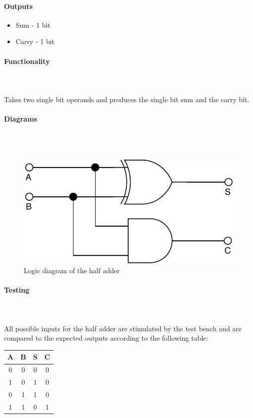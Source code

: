 \documentclass{article}
\begin{document}
    \paragraph{Outputs}
    \begin{itemize}
        \item Sum - 1 bit
        \item Carry - 1 bit
    \end{itemize}

    \paragraph{Functionality}
    \hfill\\\\
    Takes two single bit operands and produces the single bit sum and the
    carry bit.

    \paragraph{Diagrams}
    \hfill\\\\
    \begin{figure}[H]
        \centering
        \includegraphics{../diagrams/alu/adder/half_adder.pdf}
        \caption{Logic diagram of the half adder}
    \end{figure}

    \paragraph{Testing}
    \hfill\\\\
    All possible inputs for the half adder are stimulated by the test bench
    and are compared to the expected outputs according to the following
    table:

    \begin{center}
        \begin{tabular}{|c|c||c|c|}
            \hline
            A & B & S & C
            \\\hline\hline
            0 & 0 & 0 & 0
            \\\hline
            1 & 0 & 1 & 0
            \\\hline
            0 & 1 & 1 & 0
            \\\hline
            1 & 1 & 0 & 1
            \\\hline
        \end{tabular}
    \end{center}
\end{document}
